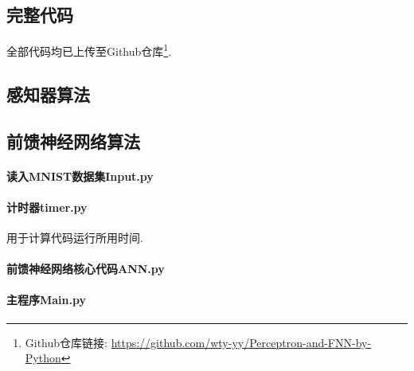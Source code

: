 \documentclass[12pt, a4paper, oneside]{ctexart}
\begin{document}
\begin{appendices}
    \section{完整代码}
    全部代码均已上传至Github仓库\footnote{Github仓库链接: \url{https://github.com/wty-yy/Perceptron-and-FNN-by-Python}}.
    \subsection{感知器算法}\label{appendix-Perceptron}
    \subsection{前馈神经网络算法}
    \paragraph{读入MNIST数据集Input.py}\label{appendix-Input}
    \paragraph{计时器timer.py}\label{appendix-timer}
    用于计算代码运行所用时间.
    \paragraph{前馈神经网络核心代码ANN.py}\label{appendix-ANN}
    \paragraph{主程序Main.py}\label{appendix-Main}
    \clearpage

\end{appendices}
\end{document}
